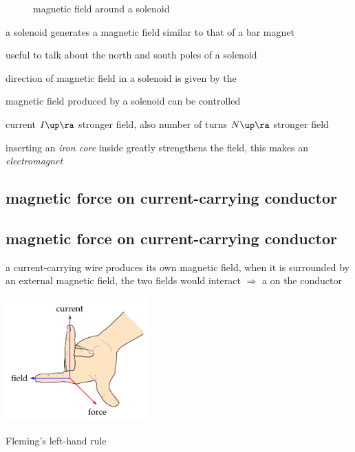 \begin{figure}[htp]
	\caption*{magnetic field around a solenoid}
\end{figure}

\cmt a solenoid generates a magnetic field similar to that of a bar magnet

useful to talk about the north and south poles of a solenoid

\cmt direction of magnetic field in a solenoid is given by the 


\cmt magnetic field produced by a solenoid can be controlled

current $I\up \ra $ stronger field, also number of turns $N\up\ra $ stronger field

\cmt inserting an \emph{iron core} inside greatly strengthens the field, this makes an \emph{electromagnet}



\subsection{magnetic force on current-carrying conductor}

\subsection{magnetic force on current-carrying conductor}

a current-carrying wire produces its own magnetic field, when it is surrounded by an external magnetic field, the two fields would interact $\Rightarrow$ a  on the conductor

\begin{marginfigure}
	\vspace*{-16pt}
	\centering
	\includegraphics[height=135pt]{left-hand.pdf}
	
	Fleming's left-hand rule
	\vspace*{-16pt}
\end{marginfigure}

